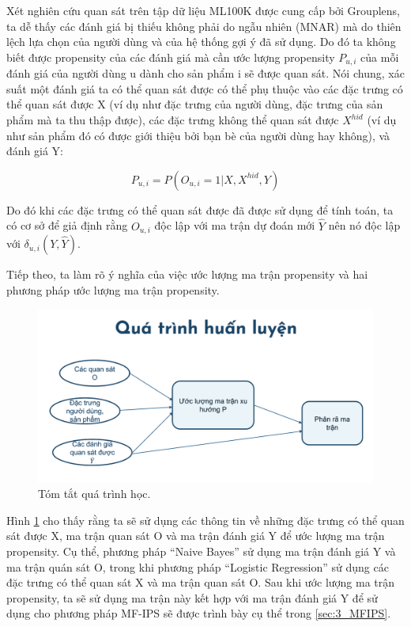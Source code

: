 Xét nghiên cứu quan sát trên tập dữ liệu ML100K được cung cấp bởi Grouplens, ta dễ thấy các đánh giá bị thiếu không phải do ngẫu nhiên (MNAR) mà do thiên lệch lựa chọn của người dùng và của hệ thống gợi ý đã sử dụng. Do đó ta không biết được propensity của các đánh giá mà cần ước lượng propensity $P_{u,i}$ của mỗi đánh giá của người dùng u dành cho sản phẩm i sẽ được quan sát. Nói chung, xác suất một đánh giá ta có thể quan sát được có thể phụ thuộc vào các đặc trưng có thể quan sát được X (ví dụ như đặc trưng của người dùng, đặc trưng của sản phẩm mà ta thu thập được), các đặc trưng không thể quan sát được $X^{hid}$ (ví dụ như sản phẩm đó có được giới thiệu bởi bạn bè của người dùng hay không), và đánh giá Y:

\begin{equation}
\label{eq:pui}
    P_{u,i}=P(O_{u,i} = 1|X, X^{hid},Y)
\end{equation}

Do đó khi các đặc trưng có thể quan sát được đã được sử dụng để tính toán, ta có cơ sở để giả định rằng $O_{u,i}$ độc lập với ma trận dự đoán mới $\hat{Y}$ nên nó độc lập với $\delta_{u,i}(Y,\hat{Y})$.

Tiếp theo, ta làm rõ ý nghĩa của việc ước lượng ma trận propensity và hai phương pháp ước lượng ma trận propensity.

\begin{figure}[h]
    \centering
    \includegraphics[width=\textwidth]{images/Chapter3/progress.png}
    \caption{Tóm tắt quá trình học.}
    \label{fig:3.3_progress}
\end{figure}

Hình \ref{fig:3.3_progress} cho thấy rằng ta sẽ sử dụng các thông tin về những đặc trưng có thể quan sát được X, ma trận quan sát O và ma trận đánh giá Y để ước lượng ma trận propensity. Cụ thể, phương pháp ``Naive Bayes'' sử dụng ma trận đánh giá Y và ma trận quán sát O, trong khi phương pháp ``Logistic Regression'' sử dụng các đặc trưng có thể quan sát X và ma trận quan sát O. Sau khi ước lượng ma trận propensity, ta sẽ sử dụng ma trận này kết hợp với ma trận đánh giá Y để sử dụng cho phương pháp MF-IPS sẽ được trình bày cụ thể trong \ref{sec:3_MFIPS}. 


